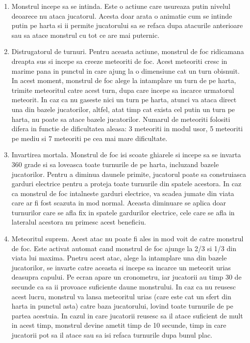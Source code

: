 \documentclass[12pt, a4paper]{article}
\begin{document}
	\begin{enumerate}
		\item Monstrul incepe sa se intinda. Este o actiune care usureaza putin nivelul deoarece nu ataca jucatorul. Acesta doar arata o animatie cum se intinde putin pe harta si ii permite jucatorului sa se refaca dupa atacurile anterioare sau sa atace monstrul cu tot ce are mai puternic.
		\item Distrugatorul de turnuri. Pentru aceasta actiune, monstrul de foc ridicamana dreapta sus si incepe sa creeze meteoriti de foc. Acest meteoriti cresc in marime pana in punctul in care ajung la o dimensiune cat un turn obisnuit. In acest moment, monstrul de foc alege la intamplare un turn de pe harta, trimite meteoritul catre acest turn, dupa care incepe sa incarce urmatorul meteorit. In caz ca nu gaseste nici un turn pe harta, atunci va ataca direct una din bazele jucatorilor, altfel, atat timp cat exista cel putin un turn pe harta, nu poate sa atace bazele jucatorilor. Numarul de meteoriti folositi difera in functie de dificultatea aleasa: 3 meteoriti in modul usor, 5 meteoriti pe mediu si 7 meteoriti pe cea mai mare dificultate.
		\item Invartirea mortala. Monstrul de foc isi scoate ghiarele si incepe sa se invarta 360 grade si sa loveasca toate turnurile de pe harta, incluzand bazele jucatorilor. Pentru a diminua daunele primite, jucatorul poate sa construiasca garduri electrice pentru a proteja toate turnurile din spatele acestora. In caz ca monstrul de foc intalneste garduri electrice, va scadea jumate din viata care ar fi fost scazuta in mod normal. Aceasta diminuare se aplica doar turnurilor care se afla fix in spatele gardurilor electrice, cele care se afla in lateralul acestora nu primesc acest beneficiu.
		\item Meteoritul suprem. Acest atac nu poate fi ales in mod voit de catre monstrul de foc. Este activat automat cand monstrul de foc ajunge la 2/3 si 1/3 din viata lui maxima. Pnetru acest atac, alege la intamplare una din bazele jucatorilor, se invarte catre aceasta si incepe sa incarce un meteorit urias deasupra capului. Pe ecran apare un cronometru, iar jucatorii au timp 30 de secunde ca sa ii provoace suficiente daune monstrului. In caz ca nu reusesc acest lucru, monstrul va lansa meteoritul urias (care este cat un sfert din harta in punctul asta) catre baza jucatorului, lovind toate turnurile de pe partea acestuia. In cazul in care jucatorii reusesc sa il atace suficient de mult in acest timp, monstrul devine ametit timp de 10 secunde, timp in care jucatorii pot sa il atace sau sa isi refaca turnurile dupa bunul plac.
	\end{enumerate}
\end{document}
